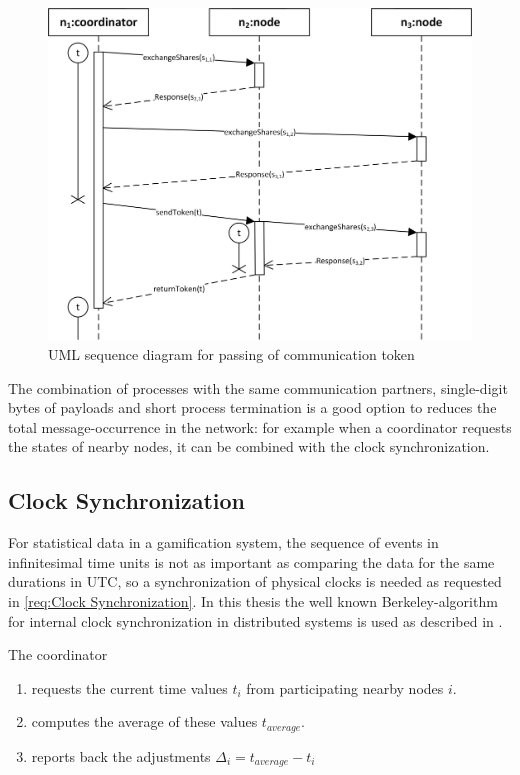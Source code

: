 		\begin{figure}[!htb] %
		\caption{\gls{UML} sequence diagram for passing of communication token} \label{figure:coordinator token passing}
		\includegraphics[scale=1.0]{figures/token-passing.png}
		\end{figure}
		
		The combination of processes with the same communication partners, single-digit bytes of payloads and short process termination is a good option to reduces the total message-occurrence in the network: for example when a coordinator requests the states of nearby nodes, it can be combined with the clock synchronization.
		
		\FloatBarrier
		
		\subsection{Clock Synchronization} \label{Clock synchronization}
		
		For statistical data in a gamification system, the sequence of events in infinitesimal time units is not as important as comparing the data for the same durations in \gls{UTC}, so a synchronization of physical clocks is needed as requested in \ref{req:Clock Synchronization}. In this thesis  the well known Berkeley-algorithm for internal clock synchronization in distributed systems is used as described in \textcite{Ghosh2015}.
		
		\noindent The coordinator
		\begin{enumerate}
			\item requests the current time values $t_i$ from participating nearby nodes $i$.
			\item computes the average of these values $t_{average}$.
			\item reports back the adjustments $\Delta_{i}=t_{average}-t_i$
		\end{enumerate}
	
